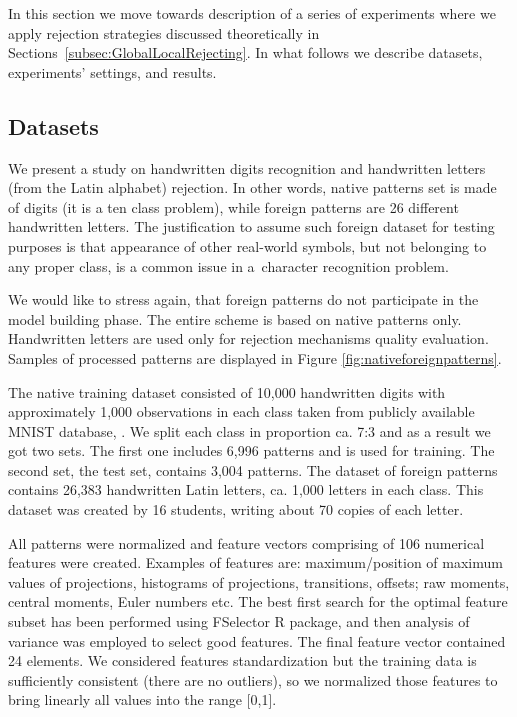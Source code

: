 \documentclass{llncs}
\begin{document}
In this section we move towards description of a series of experiments where we apply rejection strategies discussed theoretically in Sections~\ref{subsec:GlobalLocalRejecting}. In what follows we describe datasets, experiments' settings, and results. 

\vspace{-6pt}
\subsection{Datasets}
\vspace{-3pt}

We present a study on handwritten digits recognition and handwritten letters (from the Latin alphabet) rejection. In other words, native patterns set is made of digits (it is a ten class problem), while foreign patterns are 26 different handwritten letters. The justification to assume such foreign dataset for testing purposes is that appearance of other real-world symbols, but not belonging to any proper class, is a common issue in a~character recognition problem. 

We would like to stress again, that foreign patterns do not participate in the model building phase. The entire scheme is based on native patterns only. Handwritten letters are used only for rejection mechanisms quality evaluation. Samples of processed patterns are displayed in Figure \ref{fig:nativeforeignpatterns}.

The native training dataset consisted of 10,000 handwritten digits with approximately 1,000 observations in each class taken from publicly available MNIST database, \cite{LeCunCortesBurges}. We split each class in proportion ca. 7:3 and as a result we got two sets. The first one includes 6,996 patterns and is used for training. The second set, the test set, contains 3,004 patterns. The dataset of foreign patterns contains 26,383 handwritten Latin letters, ca. 1,000 letters in each class. This dataset was created by 16 students, writing about 70 copies of each letter.

All patterns were normalized and feature vectors comprising of 106 numerical features were created. Examples of features are: maximum/position of maximum values of projections, histograms of projections, transitions, offsets; raw moments, central moments, Euler numbers etc.  The best first search for the optimal feature subset has been performed using FSelector R package, \cite{Romanski} and then analysis of variance was employed to select good features. The final feature vector contained 24 elements. We considered features standardization but the training data is sufficiently consistent (there are no outliers), so we normalized those features to bring linearly all values into the range [0,1]. 
\end{document}
